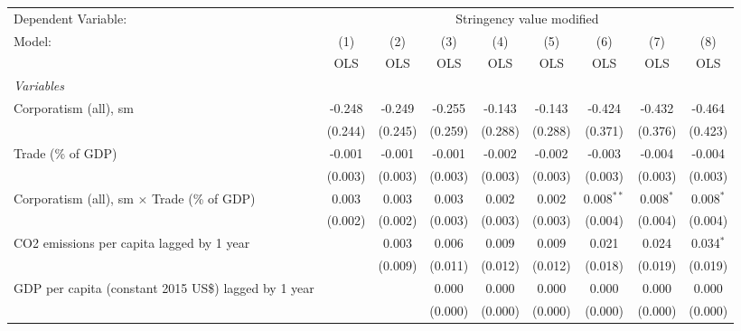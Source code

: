 
\begingroup
\centering
\begin{tabular}{lcccccccc}
   \toprule
   Dependent Variable: & \multicolumn{8}{c}{Stringency value modified}\\
   Model:                                                    & (1)     & (2)     & (3)     & (4)     & (5)     & (6)          & (7)           & (8)\\  
                                                             &  OLS    & OLS     & OLS     & OLS     & OLS     & OLS          & OLS           & OLS\\  
   \midrule
   \emph{Variables}\\
   Corporatism (all), sm                                     & -0.248  & -0.249  & -0.255  & -0.143  & -0.143  & -0.424       & -0.432        & -0.464\\   
                                                             & (0.244) & (0.245) & (0.259) & (0.288) & (0.288) & (0.371)      & (0.376)       & (0.423)\\   
   Trade (\% of GDP)                                         & -0.001  & -0.001  & -0.001  & -0.002  & -0.002  & -0.003       & -0.004        & -0.004\\   
                                                             & (0.003) & (0.003) & (0.003) & (0.003) & (0.003) & (0.003)      & (0.003)       & (0.003)\\   
   Corporatism (all), sm $\times$ Trade (\% of GDP)          & 0.003   & 0.003   & 0.003   & 0.002   & 0.002   & 0.008$^{**}$ & 0.008$^{*}$   & 0.008$^{*}$\\   
                                                             & (0.002) & (0.002) & (0.003) & (0.003) & (0.003) & (0.004)      & (0.004)       & (0.004)\\   
   CO2 emissions per capita lagged by 1 year                 &         & 0.003   & 0.006   & 0.009   & 0.009   & 0.021        & 0.024         & 0.034$^{*}$\\   
                                                             &         & (0.009) & (0.011) & (0.012) & (0.012) & (0.018)      & (0.019)       & (0.019)\\   
   GDP per capita (constant 2015 US\$) lagged by 1 year      &         &         & 0.000   & 0.000   & 0.000   & 0.000        & 0.000         & 0.000\\   
                                                             &         &         & (0.000) & (0.000) & (0.000) & (0.000)      & (0.000)       & (0.000)\\   

\end{tabular}
